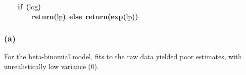 \documentclass{article}
\makeatletter
\newcommand{\hlfunctioncall}[1]{\textcolor[rgb]{.5,0,.33}{\textbf{#1}}}%
\newcommand{\hlkeyword}[1]{\textbf{#1}}%
\newcommand{\hlsymbol}[1]{#1}%
\newcommand{\hlstd}[1]{\textcolor[rgb]{0,0,0}{#1}}%
\newenvironment{kframe}{%
 \def\FrameCommand##1{\hskip\@totalleftmargin \hskip-\fboxsep
 \colorbox{shadecolor}{##1}\hskip-\fboxsep
     \hskip-\linewidth \hskip-\@totalleftmargin \hskip\columnwidth}%
 \MakeFramed {\advance\hsize-\width
   \@totalleftmargin\z@ \linewidth\hsize
   \@setminipage}}%
 {\par\unskip\endMakeFramed}
\newenvironment{knitrout}{}{} %
\makeatother
\begin{document}
\begin{knitrout}
{\begin{kframe}
\begin{flushleft}
\hlstd{}{\ }{\ }{\ }{\ }\hlkeyword{if}{\ }\hlkeyword{(}\hlsymbol{log}\hlkeyword{)}\hspace*{\fill}\\
\hlstd{}{\ }{\ }{\ }{\ }{\ }{\ }{\ }{\ }\hlfunctioncall{return}\hlkeyword{(}\hlsymbol{lp}\hlkeyword{)}{\ }\hlkeyword{else}{\ }\hlfunctioncall{return}\hlkeyword{(}\hlfunctioncall{exp}\hlkeyword{(}\hlsymbol{lp}\hlkeyword{)}\hlkeyword{)}\hspace*{\fill}\\
\hlstd{}\hlkeyword{\usebox{\hlnormalsizeboxclosebrace}}\mbox{}
\normalfont
\end{flushleft}
\end{kframe}}
\end{knitrout}


\subsubsection*{(a)}

For the beta-binomial model, fits to the raw data yielded poor estimates, with unrealistically low variance (0). 
\end{document}
